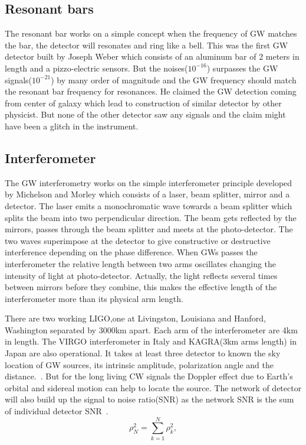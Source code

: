 \documentclass{ttuthes2007}
\begin{document}
\subsection{Resonant bars}

The resonant bar works on a simple concept when the frequency of
\ac{GW} matches the bar, the detector will resonates and ring like a bell. This
was the first \ac{GW} detector built by Joseph Weber which consists of an
aluminum bar of 2 meters in length and a pizzo-electric sensors. But the
noises($10^{-16}$) surpasses the \ac{GW} signals($10^{-21}$) by many order of
magnitude and the GW frequency should match the resonant bar frequency for
resonances. He claimed the \ac{GW} detection coming from center of galaxy which
lead to construction of similar detector by other physicist. But none of the
other detector saw any signals and the claim might have been a glitch in the
instrument.
\subsection{Interferometer}
The \ac{GW} interferometry works on the simple interferometer principle
developed by Michelson and Morley which consists of a laser, beam splitter,
mirror and a detector. The laser emits a monochromatic wave towards a beam
splitter which splits the beam into two perpendicular direction. The beam gets
reflected by the mirrors, passes through the beam splitter and meets at the
photo-detector. The two waves superimpose at the detector to give constructive or
destructive interference depending on the phase difference. When \acp{GW} passes
the interferometer the relative length between two arms oscillates changing the
intensity of light at photo-detector. Actually, the light reflects several times
between mirrors before they combine, this makes the effective length of the
interferometer more than its physical arm length.

There are two working \ac{LIGO},one at Livingston, Louisiana and Hanford, Washington 
separated by 3000km apart. Each arm of the interferometer are 4km in length. The
VIRGO interferometer in Italy and KAGRA(3km arms length) in Japan are also
operational. It takes at least three detector to known the sky location of 
\ac{GW} sources, its intrinsic amplitude, polarization angle and the
distance.~\cite{Schutz_2011}. But for the long living \ac{CW} signals the Doppler effect
due to Earth's orbital and sidereal motion can help to locate the source. The
network of detector will also build up the signal to noise ratio(SNR) as the
network SNR is the sum of individual detector SNR~\cite{Schutz_2011}.
\begin{equation}
\rho_N^2=\sum_{k=1}^N \rho_k^2 ,
\end{equation}
\end{document}
